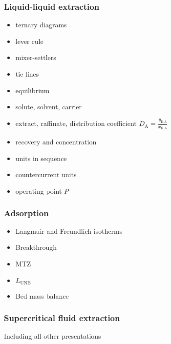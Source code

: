 {
\begin{frame}\frametitle{Liquid-liquid extraction {}}
	{}
	\begin{itemize}
		\item	ternary diagrams
		\item	lever rule
		\item	mixer-settlers
		\item	tie lines
		\item	equilibrium
		\item	solute, solvent, carrier
		\item	extract, raffinate, distribution coefficient $D_\text{A} = \displaystyle \frac{y_\text{E,A}}{x_\text{R,A}}$
		\item	recovery and concentration
		\item	units in sequence
		\item	countercurrent units
		\item	operating point $P$
	\end{itemize}
\end{frame}}

{
\begin{frame}\frametitle{Adsorption {}}
	\begin{itemize}
		\item	Langmuir and Freundlich isotherms
		\item	Breakthrough
		\item	MTZ
		\item	$L_\text{UNB}$
		\item	Bed mass balance
	\end{itemize}
\end{frame}}

{
\begin{frame}\frametitle{Supercritical fluid extraction {}}
	\vfill
	\vspace{7cm}
	Including all other presentations
\end{frame}}

